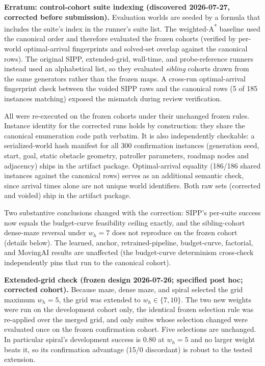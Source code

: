 \documentclass[letterpaper]{article} %
\begin{document}
\textbf{Erratum: control-cohort suite indexing (discovered 2026-07-27, corrected before submission).} Evaluation worlds are seeded by a formula that includes the suite's index in the runner's suite list. The weighted-A\textsuperscript{*} baseline used the canonical order and therefore evaluated the frozen cohorts (verified by per-world optimal-arrival fingerprints and solved-set overlap against the canonical rows). The original SIPP, extended-grid, wall-time, and probe-reference runners instead used an alphabetical list, so they evaluated \emph{sibling} cohorts drawn from the same generators rather than the frozen maps. A cross-run optimal-arrival fingerprint check between the voided SIPP raws and the canonical rows (5 of 185 instances matching) exposed the mismatch during review verification.

All were re-executed on the frozen cohorts under their unchanged frozen rules. Instance identity for the corrected runs holds by construction: they share the canonical enumeration code path verbatim. It is also independently checkable: a serialized-world hash manifest for all 300 confirmation instances (generation seed, start, goal, static obstacle geometry, patroller parameters, roadmap nodes and adjacency) ships in the artifact package. Optimal-arrival equality (186/186 shared instances against the canonical rows) serves as an additional semantic check, since arrival times alone are not unique world identifiers. Both raw sets (corrected and voided) ship in the artifact package.

Two substantive conclusions changed with the correction: SIPP's per-suite success now equals the budget-curve feasibility ceiling exactly, and the sibling-cohort dense-maze reversal under $w_h{=}7$ does not reproduce on the frozen cohort (details below). The learned, anchor, retrained-pipeline, budget-curve, factorial, and MovingAI results are unaffected (the budget-curve determinism cross-check independently pins that run to the canonical cohort).

\textbf{Extended-grid check (frozen design 2026-07-26; specified post hoc; corrected cohort).} Because maze, dense maze, and spiral selected the grid maximum $w_h{=}5$, the grid was extended to $w_h \in \{7, 10\}$. The two new weights were run on the development cohort only, the identical frozen selection rule was re-applied over the merged grid, and only suites whose selection changed were evaluated once on the frozen confirmation cohort. Five selections are unchanged. In particular spiral's development success is 0.80 at $w_h{=}5$ and no larger weight beats it, so its confirmation advantage (15/0 discordant) is robust to the tested extension.
\end{document}
